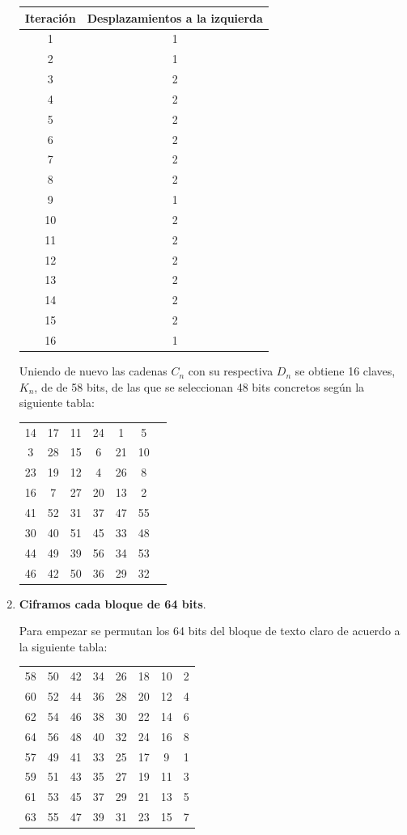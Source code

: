 \documentclass[nochap]{apuntesURJC}
\begin{document}
\begin{enumerate}
\begin{center}
\begin{tabular}{cc}
Iteración & Desplazamientos a la izquierda \\
\hline
1  & 1 \\
2  & 1 \\
3  & 2 \\
4  & 2 \\
5  & 2 \\
6  & 2 \\
7  & 2 \\
8  & 2 \\
9  & 1 \\
10 &  2 \\
11 &  2 \\
12 &  2 \\
13 &  2 \\
14 &  2 \\
15 &  2 \\
16 &  1
\end{tabular}
\end{center}

Uniendo de nuevo las cadenas $C_n$ con su respectiva $D_n$ se obtiene 16 claves, $K_n$, de de 58 bits, de las que se seleccionan 48 bits concretos según la siguiente tabla:

\begin{center}
\begin{tabular}{ccccccc}
14 &  17 &  11 & 24 &   1 &   5 \\
3  & 28  & 15  & 6  & 21  & 10 \\
23 &  19 &  12 &  4 &  26 &   8 \\
16 &   7 &  27 & 20 &  13 &   2 \\
41 &  52 &  31 & 37 &  47 &  55 \\
30 &  40 &  51 & 45 &  33 &  48 \\
44 &  49 &  39 & 56 &  34 &  53 \\
46 &  42 &  50 & 36 &  29 &  32
\end{tabular}
\end{center}

\item \textbf{Ciframos cada bloque de 64 bits}.

Para empezar se permutan los 64 bits del bloque de texto claro de acuerdo a la siguiente tabla:

\begin{center}
\begin{tabular}{cccccccc}
58 & 50 & 42 & 34 & 26 & 18 & 10 & 2\\
60 & 52 & 44 & 36 & 28 & 20 & 12 & 4\\
62 & 54 & 46 & 38 & 30 & 22 & 14 & 6\\
64 & 56 & 48 & 40 & 32 & 24 & 16 & 8\\
57 & 49 & 41 & 33 & 25 & 17 &  9 & 1\\
59 & 51 & 43 & 35 & 27 & 19 & 11 & 3\\
61 & 53 & 45 & 37 & 29 & 21 & 13 & 5\\
63 & 55 & 47 & 39 & 31 & 23 & 15 & 7
\end{tabular}
\end{center}


\end{enumerate}
\end{document}
